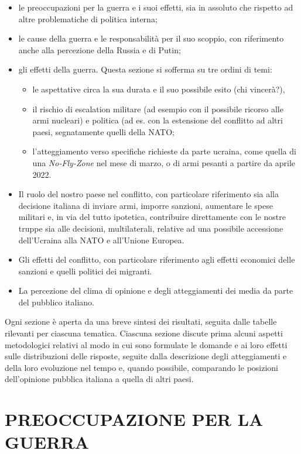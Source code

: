 \documentclass[
]{book}
\providecommand{\tightlist}{%
  \setlength{\itemsep}{0pt}\setlength{\parskip}{0pt}}
\begin{document}
\begin{itemize}
\item
  le preoccupazioni per la guerra e i suoi effetti, sia in assoluto che rispetto ad altre problematiche di politica interna;
\item
  le cause della guerra e le responsabilità per il suo scoppio, con riferimento anche alla percezione della Russia e di Putin;
\item
  gli effetti della guerra. Questa sezione si sofferma su tre ordini di temi:

  \begin{itemize}
  \tightlist
  \item
    le aspettative circa la sua durata e il suo possibile esito (chi vincerà?),
  \item
    il rischio di escalation militare (ad esempio con il possibile ricorso alle armi nucleari) e politica (ad es. con la estensione del conflitto ad altri paesi, segnatamente quelli della NATO;
  \item
    l'atteggiamento verso specifiche richieste da parte ucraina, come quella di una \emph{No-Fly-Zone} nel mese di marzo, o di armi pesanti a partire da aprile 2022.
  \end{itemize}
\item
  Il ruolo del nostro paese nel conflitto, con particolare riferimento sia alla decisione italiana di inviare armi, imporre sanzioni, aumentare le spese militari e, in via del tutto ipotetica, contribuire direttamente con le nostre truppe sia alle decisioni, multilaterali, relative ad una possibile accessione dell'Ucraina alla NATO e all'Unione Europea.
\item
  Gli effetti del conflitto, con particolare riferimento agli effetti economici delle sanzioni e quelli politici dei migranti.
\item
  La percezione del clima di opinione e degli atteggiamenti dei media da parte del pubblico italiano.
\end{itemize}

Ogni sezione è aperta da una breve sintesi dei risultati, seguita dalle tabelle rilevanti per ciascuna tematica. Ciascuna sezione discute prima alcuni aspetti metodologici relativi al modo in cui sono formulate le domande e ai loro effetti sulle distribuzioni delle risposte, seguite dalla descrizione degli atteggiamenti e della loro evoluzione nel tempo e, quando possibile, comparando le posizioni dell'opinione pubblica italiana a quella di altri paesi.

\hypertarget{preoccupazione-per-la-guerra}{%
\chapter{PREOCCUPAZIONE PER LA GUERRA}\label{preoccupazione-per-la-guerra}}
\end{document}

